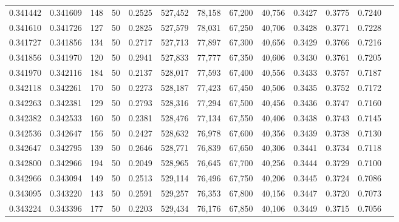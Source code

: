 \begin{tabular}{rrrrrrrrrrrrr}
0.341442 & 0.341609 &   148 &  50 &                                     0.2525 & 527,452 &  78,158 &  67,200 &  40,756 & 0.3427 & 0.3775 & 0.7240 \\
0.341610 & 0.341726 &   127 &  50 &                                     0.2825 & 527,579 &  78,031 &  67,250 &  40,706 & 0.3428 & 0.3771 & 0.7228 \\
0.341727 & 0.341856 &   134 &  50 &                                     0.2717 & 527,713 &  77,897 &  67,300 &  40,656 & 0.3429 & 0.3766 & 0.7216 \\
0.341856 & 0.341970 &   120 &  50 &                                     0.2941 & 527,833 &  77,777 &  67,350 &  40,606 & 0.3430 & 0.3761 & 0.7205 \\
0.341970 & 0.342116 &   184 &  50 &                                     0.2137 & 528,017 &  77,593 &  67,400 &  40,556 & 0.3433 & 0.3757 & 0.7187 \\
0.342118 & 0.342261 &   170 &  50 &                                     0.2273 & 528,187 &  77,423 &  67,450 &  40,506 & 0.3435 & 0.3752 & 0.7172 \\
0.342263 & 0.342381 &   129 &  50 &                                     0.2793 & 528,316 &  77,294 &  67,500 &  40,456 & 0.3436 & 0.3747 & 0.7160 \\
0.342382 & 0.342533 &   160 &  50 &                                     0.2381 & 528,476 &  77,134 &  67,550 &  40,406 & 0.3438 & 0.3743 & 0.7145 \\
0.342536 & 0.342647 &   156 &  50 &                                     0.2427 & 528,632 &  76,978 &  67,600 &  40,356 & 0.3439 & 0.3738 & 0.7130 \\
0.342647 & 0.342795 &   139 &  50 &                                     0.2646 & 528,771 &  76,839 &  67,650 &  40,306 & 0.3441 & 0.3734 & 0.7118 \\
0.342800 & 0.342966 &   194 &  50 &                                     0.2049 & 528,965 &  76,645 &  67,700 &  40,256 & 0.3444 & 0.3729 & 0.7100 \\
0.342966 & 0.343094 &   149 &  50 &                                     0.2513 & 529,114 &  76,496 &  67,750 &  40,206 & 0.3445 & 0.3724 & 0.7086 \\
0.343095 & 0.343220 &   143 &  50 &                                     0.2591 & 529,257 &  76,353 &  67,800 &  40,156 & 0.3447 & 0.3720 & 0.7073 \\
0.343224 & 0.343396 &   177 &  50 &                                     0.2203 & 529,434 &  76,176 &  67,850 &  40,106 & 0.3449 & 0.3715 & 0.7056 \\

\end{tabular}
